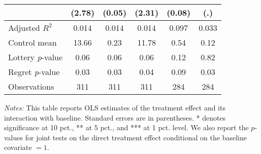 \begin{table}[h]
{\begin{threeparttable}
\begin{tabular}{l*{5}{c}}
                &   (2.78)         &   (0.05)         &   (2.31)         &   (0.08)         &      (.)         \\
\midrule
Adjusted \(R^{2}\)&    0.014         &    0.014         &    0.014         &    0.097         &    0.033         \\
Control mean    &    13.66         &     0.23         &    11.78         &     0.54         &     0.12         \\
Lottery \emph{p}-value&     0.06         &     0.06         &     0.06         &     0.12         &     0.82         \\
Regret \emph{p}-value&     0.03         &     0.03         &     0.04         &     0.09         &     0.03         \\
Observations    &      311         &      311         &      311         &      284         &      284         \\
\bottomrule \end{tabular} \begin{tablenotes}[flushleft] \footnotesize \item \emph{Notes:} This table reports OLS estimates of the treatment effect and its interaction with baseline. Standard errors are in parentheses. * denotes significance at 10 pct., ** at 5 pct., and *** at 1 pct. level. We also report the \(p\)-values for joint tests on the direct treatment effect conditional on the baseline covariate $= 1$. \end{tablenotes} \end{threeparttable} } \end{table}

